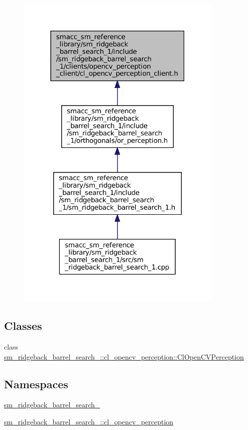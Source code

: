 \begin{figure}[H]
\begin{center}
\leavevmode
\includegraphics[width=279pt]{sm__ridgeback__barrel__search__1_2include_2sm__ridgeback__barrel__search__1_2clients_2opencv__pe7d4051039c7ef121cb338d4bc38535de}
\end{center}
\end{figure}
\subsection*{Classes}
\begin{DoxyCompactItemize}
\item 
class \hyperlink{classsm__ridgeback__barrel__search__1_1_1cl__opencv__perception_1_1ClOpenCVPerception}{sm\+\_\+ridgeback\+\_\+barrel\+\_\+search\+\_\+::cl\+\_\+opencv\+\_\+perception\+::\+Cl\+Open\+C\+V\+Perception}
\end{DoxyCompactItemize}
\subsection*{Namespaces}
\begin{DoxyCompactItemize}
\item 
 \hyperlink{namespacesm__ridgeback__barrel__search__1}{sm\+\_\+ridgeback\+\_\+barrel\+\_\+search\+\_}
\item 
 \hyperlink{namespacesm__ridgeback__barrel__search__1_1_1cl__opencv__perception}{sm\+\_\+ridgeback\+\_\+barrel\+\_\+search\+\_\+::cl\+\_\+opencv\+\_\+perception}
\end{DoxyCompactItemize}
